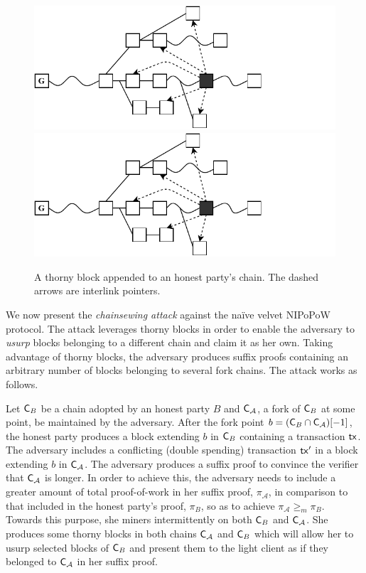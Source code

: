 \begin{figure}[h]
	\begin{center}
		\iftwocolumn
			\includegraphics[width=0.9\columnwidth]{figures/thorny_block.pdf}
		\else
			\includegraphics[width=0.8\columnwidth]{figures/thorny_block.pdf}
		\fi
	\end{center}
	\caption{A thorny block appended to an honest party's chain.
	The dashed arrows are interlink pointers.}
	\label{fig:thorny_block}
\end{figure}

We now present the \emph{chainsewing attack} against the na\"ive velvet NIPoPoW
protocol. The attack leverages thorny blocks in order to enable the adversary to
\emph{usurp} blocks belonging to a different chain and claim it as her own.
Taking advantage of thorny blocks, the adversary produces suffix proofs
containing an arbitrary number of blocks belonging to several fork chains. The
attack works as follows.

Let $\mathsf{C}_B$ be a chain adopted by an honest party $B$ and $\mathsf{C}_\mathcal{A}$, a fork of $\mathsf{C}_B$ at some point, be maintained by the adversary. After the fork point $b = (\mathsf{C}_B \cap \mathsf{C}_\mathcal{A})[-1]$, the honest party produces a block extending $b$ in $\mathsf{C}_B$ containing a transaction $\mathsf{tx}$. The adversary includes a conflicting (double spending) transaction $\mathsf{tx}'$ in a block extending $b$ in $\mathsf{C}_\mathcal{A}$.
The adversary produces a suffix proof to convince the verifier that $\mathsf{C}_\mathcal{A}$ is longer. In order to achieve this, the adversary needs to include a greater amount of total proof-of-work in her suffix proof, $\pi_\mathcal{A}$, in comparison to that included in the honest party's proof, $\pi_B$, so as to achieve $\pi_\mathcal{A} \geq_m \pi_B$. Towards this purpose, she miners intermittently on both $\mathsf{C}_B$ and $\mathsf{C}_\mathcal{A}$. She produces some thorny blocks in both chains $\mathsf{C}_\mathcal{A}$ and $\mathsf{C}_B$ which will allow her to usurp selected blocks of $\mathsf{C}_B$ and present them to the light client as if they belonged to $\mathsf{C}_\mathcal{A}$ in her suffix proof.

